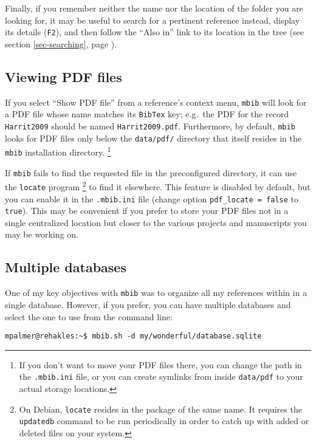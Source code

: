 \documentclass[10pt]{article}
\newcommand*{\mbib}{\texttt{mbib}\xspace}
\newcommand*{\bibtex}{\texttt{BibTex}\xspace}
\newcommand*{\ini}{\texttt{.mbib.ini}\xspace}
\newcommand*{\key}[1]{\texttt{#1}\xspace}
\begin{document}
\noindent Finally, if you remember neither the name nor the location of the folder you are looking for, it may be useful to search for a pertinent reference instead, display its details (\key{F2}), and then follow the ``Also in'' link to its location in the tree (see section \ref{sec-searching}, page \pageref{pg-also-in}). 

\subsection{Viewing PDF files}

If you select ``Show PDF file'' from a reference's context menu, \mbib will look for a PDF file whose name matches its \bibtex key; e.g.\ the PDF for the record \texttt{Harrit2009} should be named \texttt{Harrit2009.pdf}. Furthermore, by default, \mbib looks for PDF files only below the \texttt{data/pdf/} directory that itself resides in the \mbib installation directory.%
%
\footnote{If you don't want to move your PDF files there, you can change the path in the \ini file, or you can create symlinks from inside \texttt{data/pdf} to your actual storage locations.}

If \mbib fails to find the requested file in the preconfigured directory, it can use the \texttt{locate} program%
%
\footnote{On Debian, \texttt{locate} resides in the package of the same name. It requires the \texttt{updatedb} command to be run periodically in order to catch up with added or deleted files on your system.}
%
to find it elsewhere. This feature is disabled by default, but you can enable it in the \ini file (change option \texttt{pdf\_locate = false} to \texttt{true}). This may be convenient if you prefer to store your PDF files not in a single centralized location but closer to the various projects and manuscripts you may be working on. 

\subsection{Multiple databases}

One of my key objectives with \mbib was to organize all my references within in a single database. However, if you prefer, you can have multiple databases and select the one to use from the command line: 

\begin{verbatim}
mpalmer@rehakles:~$ mbib.sh -d my/wonderful/database.sqlite
\end{verbatim}
\end{document}

